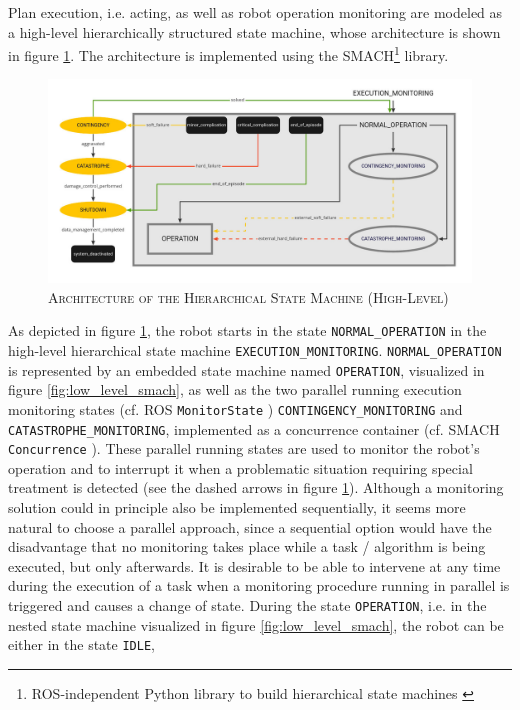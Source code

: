 \documentclass[english, master, utf8]{base/thesis_KBS}
\newcommand{\code}[1]{\colorbox{light-gray}{\texttt{#1}}}
\begin{document}
\noindent
Plan execution, i.e. acting, as well as robot operation monitoring are modeled as a high-level hierarchically structured state machine, whose architecture is shown
in figure \ref{fig:high_level_smach}. The architecture is implemented using the SMACH\footnote{ROS-independent Python library to build hierarchical state machines \cite{smach}} 
library.
\begin{figure}[H]
    \centering
    \includegraphics[width=\textwidth]{pics/SMACH_high_level.jpg}
    \caption{\textsc{Architecture of the Hierarchical State Machine (High-Level)}}
    \label{fig:high_level_smach}
\end{figure}
\noindent
As depicted in figure \ref{fig:high_level_smach}, the robot starts in the state \code{NORMAL\_OPERATION} in the high-level hierarchical state machine \code{EXECUTION\_MONITORING}.
\code{NORMAL\_OPERATION} is represented by an embedded state machine named \code{OPERATION}, visualized in figure \ref{fig:low_level_smach}, as well as the two
parallel running execution monitoring states (cf. ROS \code{MonitorState} \cite{monitor_state}) \code{CONTINGENCY\_MONITORING} and \code{CATASTROPHE\_MONITORING}, 
implemented as a concurrence container (cf. SMACH \code{Concurrence} \cite{concurrence_container}).
These parallel running states are used to monitor the robot's operation and to interrupt it when a problematic situation requiring special treatment is detected
(see the dashed arrows in figure \ref{fig:high_level_smach}).
Although a monitoring solution could in principle also be implemented sequentially, it seems more natural to choose a parallel approach, since a sequential option
would have the disadvantage that no monitoring takes place while a task / algorithm is being executed, but only afterwards.
It is desirable to be able to intervene at any time during the execution of a task when a monitoring procedure running in parallel is triggered and causes a change of state.
During the state \code{OPERATION}, i.e. in the nested state machine visualized in figure \ref{fig:low_level_smach}, the robot can be either in the state \code{IDLE}, 
\end{document}

